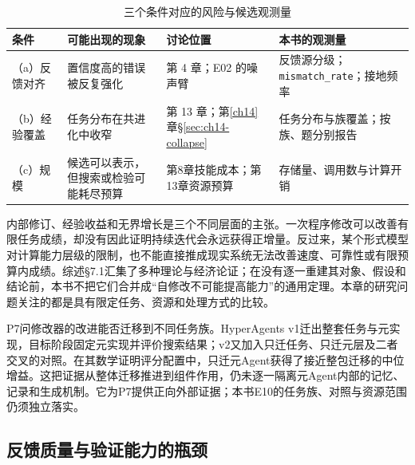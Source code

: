 \begin{table}[htbp]
\centering
\caption{三个条件对应的风险与候选观测量}
\label{tab:ch16-cond}
\begin{footnotesize}
\begin{tabular}{>{\raggedright\arraybackslash}p{1.6cm}>{\raggedright\arraybackslash}p{4.0cm}>{\raggedright\arraybackslash}p{3.6cm}>{\raggedright\arraybackslash}p{4.2cm}}
\toprule
条件 & 可能出现的现象 & 讨论位置 & 本书的观测量 \\
\midrule
（a）反馈对齐 & 置信度高的错误被反复强化 & 第 4 章；E02 的噪声臂 & 反馈源分级；\texttt{mismatch\_rate}；接地频率 \\
\midrule
（b）经验覆盖 & 任务分布在共进化中收窄 & 第 13 章；第\ref{ch14}章\S\ref{sec:ch14-collapse} & 任务分布与族覆盖；按族、题分别报告 \\
\midrule
（c）规模 & 候选可以表示，但搜索或检验可能耗尽预算 & 第8章技能成本；第13章资源预算 & 存储量、调用数与计算开销 \\
\bottomrule
\end{tabular}
\end{footnotesize}
\end{table}

\begin{sloppypar}
内部修订、经验收益和无界增长是三个不同层面的主张。一次程序修改可以改善有限任务成绩，却没有因此证明持续迭代会永远获得正增量。反过来，某个形式模型对计算能力层级的限制，也不能直接推成现实系统无法改善速度、可靠性或有限预算内成绩。综述§7.1汇集了多种理论与经济论证；在没有逐一重建其对象、假设和结论前，本书不把它们合并成“自修改不可能提高能力”的通用定理。本章的研究问题关注的都是具有限定任务、资源和处理方式的比较。

\end{sloppypar}

\begin{sloppypar}
P7问修改器的改进能否迁移到不同任务族。HyperAgents v1迁出整套任务与元实现，目标阶段固定元实现并评价搜索结果\cite{hyperagents-2603}；v2又加入只迁任务、只迁元层及二者交叉的对照。在其数学证明评分配置中，只迁元Agent获得了接近整包迁移的中位增益\cite{hyperagents-2603-v2}。这把证据从整体迁移推进到组件作用，仍未逐一隔离元Agent内部的记忆、记录和生成机制。它为P7提供正向外部证据；本书E10的任务族、对照与资源范围仍须独立落实。

\end{sloppypar}

\subsection{反馈质量与验证能力的瓶颈}
\label{sec:ch16-feedback}

